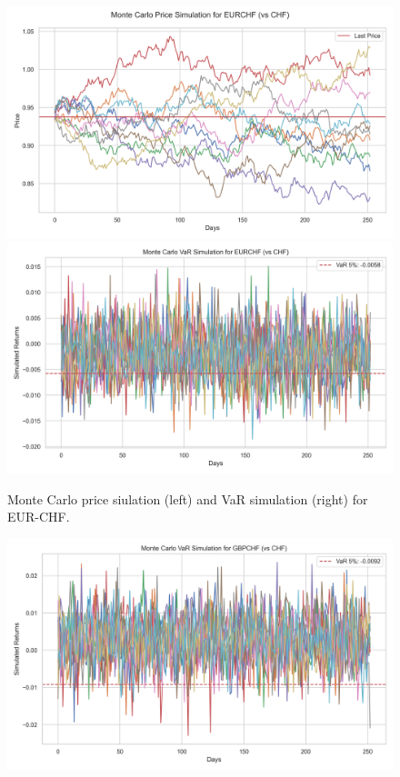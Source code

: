 \documentclass{article}
\begin{document}
\begin{figure}[H]
    \centering  \includegraphics[width=0.48\linewidth]{reports/figures/monte_carlo_price_simulation_EURCHF_vs_CHF.png} \label{fig:monte_carlo_price_simulation_EURCHF_vs_CHF}
    \includegraphics[width=0.48\linewidth]{reports/figures/monte_carlo_var_simulation_EURCHF_vs_CHF.png} \label{fig:monte_carlo_var_simulation_EURCHF_vs_CHF}
    \caption{\footnotesize Monte Carlo price siulation (left) and VaR simulation (right) for EUR-CHF.}
\end{figure}

\begin{figure}[H]
    \centering  \includegraphics[width=0.7\linewidth]{reports/figures/monte_carlo_var_simulation_GBPCHF_vs_CHF.png} \label{fig:monte_carlo_var_simulation_GBPCHF_vs_CHF}
\end{figure}

\printbibliography
\end{document}
